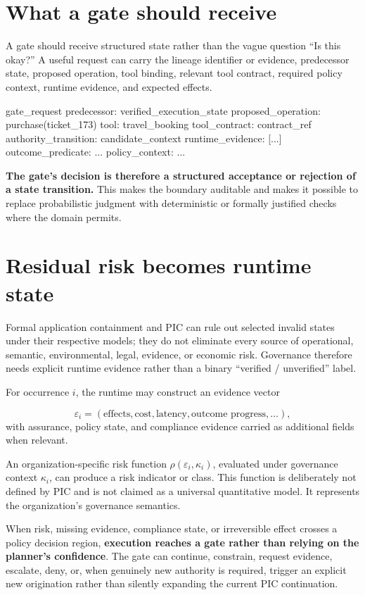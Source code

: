 \documentclass[10pt,oneside,openany]{book}
\begin{document}
\section{What a gate should receive}
A gate should receive structured state rather than the vague question ``Is this okay?'' A useful request can carry the lineage identifier or evidence, predecessor state, proposed operation, tool binding, relevant tool contract, required policy context, runtime evidence, and expected effects.

\begin{codeblock}
gate_request {
  predecessor: verified_execution_state
  proposed_operation: purchase(ticket_173)
  tool: travel_booking
  tool_contract: contract_ref
  authority_transition: candidate_context
  runtime_evidence: [...]
  outcome_predicate: ...
  policy_context: ...
}
\end{codeblock}

\textbf{The gate's decision is therefore a structured acceptance or rejection of a state transition.} This makes the boundary auditable and makes it possible to replace probabilistic judgment with deterministic or formally justified checks where the domain permits.

\section{Residual risk becomes runtime state}
Formal application containment and PIC can rule out selected invalid states under their respective models; they do not eliminate every source of operational, semantic, environmental, legal, evidence, or economic risk. Governance therefore needs explicit runtime evidence rather than a binary ``verified / unverified'' label.

For occurrence $i$, the runtime may construct an evidence vector

\[
\varepsilon_i=(\text{effects},\text{cost},\text{latency},\text{outcome progress},\ldots),
\]
with assurance, policy state, and compliance evidence carried as additional fields when relevant.

An organization-specific risk function $\rho(\varepsilon_i,\kappa_i)$, evaluated under governance context $\kappa_i$, can produce a risk indicator or class. This function is deliberately not defined by PIC and is not claimed as a universal quantitative model. It represents the organization's governance semantics.

When risk, missing evidence, compliance state, or irreversible effect crosses a policy decision region, \textbf{execution reaches a gate rather than relying on the planner's confidence}. The gate can continue, constrain, request evidence, escalate, deny, or, when genuinely new authority is required, trigger an explicit new origination rather than silently expanding the current PIC continuation.
\end{document}

